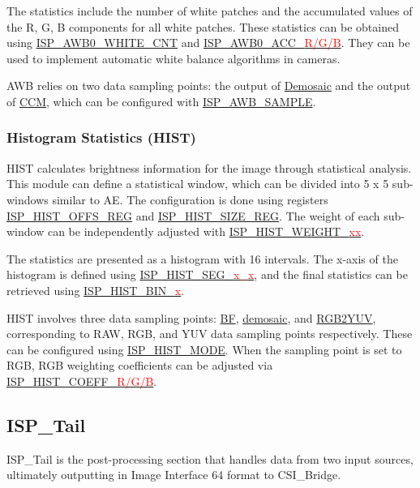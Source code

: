 \documentclass[main\_\_EN.tex]{subfiles}
\begin{document}
The statistics include the number of white patches and the accumulated values of the R, G, B components for all white patches. These statistics can be obtained using \hyperref[fielddesc:ISPAWB0WHITECNT]{ISP\_AWB0\_WHITE\_CNT} and \hyperref[fielddesc:ISPAWB0ACCR]{ISP\_AWB0\_ACC\_\textcolor{red}{R/G/B}}. They can be used to implement automatic white balance algorithms in cameras.

AWB relies on two data sampling points: the output of \hyperref[sec:isp_demosaic]{Demosaic} and the output of \hyperref[sec:isp_ccm]{CCM}, which can be configured with \hyperref[fielddesc:ISPAWBSAMPLE]{ISP\_AWB\_SAMPLE}.


\subsubsection{Histogram Statistics (HIST)}

HIST calculates brightness information for the image through statistical analysis. This module can define a statistical window, which can be divided into 5 x 5 sub-windows similar to AE. The configuration is done using registers \hyperref[regdesc:ISPHISTOFFSREG]{ISP\_HIST\_OFFS\_REG} and \hyperref[regdesc:ISPHISTSIZEREG]{ISP\_HIST\_SIZE\_REG}. The weight of each sub-window can be independently adjusted with \hyperref[fielddesc:ISPHISTWEIGHT00]{ISP\_HIST\_WEIGHT\_\textcolor{red}{xx}}.

The statistics are presented as a histogram with 16 intervals. The x-axis of the histogram is defined using \hyperref[fielddesc:ISPHISTSEG01]{ISP\_HIST\_SEG\_\textcolor{red}{x\_x}}, and the final statistics can be retrieved using \hyperref[fielddesc:ISPHISTBIN0]{ISP\_HIST\_BIN\_\textcolor{red}{x}}.

HIST involves three data sampling points: \hyperref[sec:isp_bf]{BF}, \hyperref[sec:isp_demosaic]{demosaic}, and \hyperref[sec:isp_rgb2yuv]{RGB2YUV}, corresponding to RAW, RGB, and YUV data sampling points respectively. These can be configured using \hyperref[fielddesc:ISPHISTMODE]{ISP\_HIST\_MODE}. When the sampling point is set to RGB, RGB weighting coefficients can be adjusted via \hyperref[fielddesc:ISPHISTCOEFFR]{ISP\_HIST\_COEFF\_\textcolor{red}{R/G/B}}.


\subsection{ISP\_Tail}
ISP\_Tail is the post-processing section that handles data from two input sources, ultimately outputting in Image Interface 64 format to CSI\_Bridge.
\end{document}
